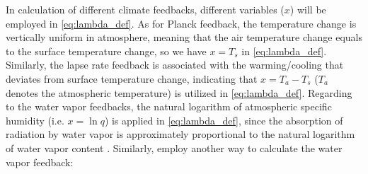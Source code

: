 In calculation of different climate feedbacks, different variables ($x$) will be employed in \eqref{eq:lambda_def}. As for Planck feedback, the temperature change is vertically uniform in atmosphere, meaning that the air temperature change equals to the surface temperature change, so we have $x=T_s$ in \eqref{eq:lambda_def}. Similarly, the lapse rate feedback is associated with the warming/cooling that deviates from surface temperature change, indicating that $x=T_a-T_s$ ($T_a$ denotes the atmospheric temperature) is utilized in \eqref{eq:lambda_def}.
Regarding to the water vapor feedbacks, the natural logarithm of atmospheric specific humidity (i.e. $x=\ln q$) is applied in \eqref{eq:lambda_def}, since the absorption of radiation by water vapor is approximately proportional to the natural logarithm of water vapor content \citep{Shell2008,Feldl2016,Liu2018}. %
Similarly, \cite{Huang2017} employ another way to calculate the water vapor feedback:


